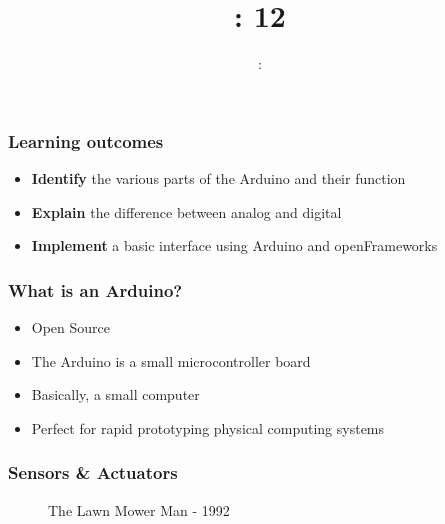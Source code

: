 \usepackage{../../beamerthemeFalmouthGamesAcademy}
\usepackage{multimedia}
\graphicspath{ {../../} }


\usepackage[normalem]{ulem}
\usepackage{wasysym}
\usepackage{listings}
\usepackage{pdfpages}

\usetikzlibrary{arrows,automata}




\title{\sessionnumber: 12}
\subtitle{\modulecode: \moduletitle}

\frame{\titlepage}

\begin{frame}
	\frametitle{Learning outcomes}
	\begin{itemize}
		\item \textbf{Identify} the various parts of the Arduino and their function
		\item \textbf{Explain} the difference between analog and digital
		\item \textbf{Implement} a basic interface using Arduino and openFrameworks
	\end{itemize}
\end{frame}

\begin{frame}
  \frametitle{What is an Arduino?}
  \begin{itemize}
    \item Open Source
    \item The Arduino is a small microcontroller board
    \item Basically, a small computer 
    \item Perfect for rapid prototyping physical computing systems
  \end{itemize}
\end{frame}

\begin{frame}
	\frametitle{Sensors \& Actuators}
	\begin{figure}
		\caption{The Lawn Mower Man - 1992}
	\end{figure}
\end{frame}

